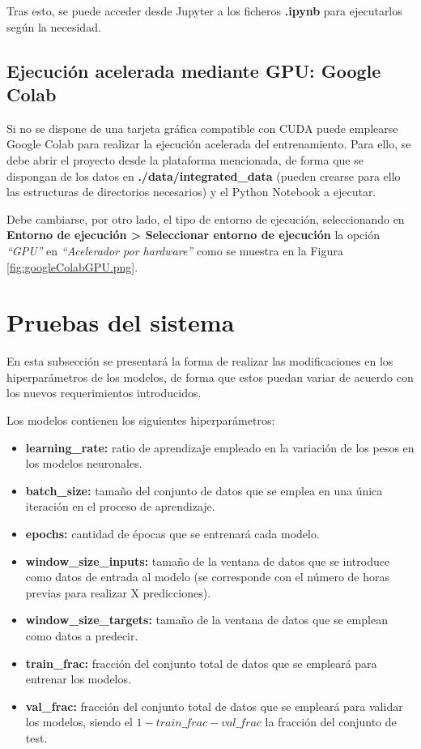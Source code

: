 
Tras esto, se puede acceder desde Jupyter a los ficheros \textbf{.ipynb} para ejecutarlos según la necesidad.

\subsection{Ejecución acelerada mediante GPU: Google Colab}
Si no se dispone de una tarjeta gráfica compatible con CUDA puede emplearse Google Colab para realizar la ejecución acelerada del entrenamiento.
Para ello, se debe abrir el proyecto desde la plataforma mencionada, de forma que se dispongan de los datos en \textbf{./data/integrated\_data} 
(pueden crearse para ello las estructuras de directorios necesarios) y el Python Notebook a ejecutar.

Debe cambiarse, por otro lado, el tipo de entorno de ejecución, seleccionando en \textbf{Entorno de ejecución > Seleccionar entorno de ejecución}
la opción \textit{``GPU''} en \textit{``Acelerador por hardware''} como se muestra en la Figura \ref{fig:googleColabGPU.png}.


\section{Pruebas del sistema}
En esta subsección se presentará la forma de realizar las modificaciones en los hiperparámetros de los modelos, de forma que estos puedan variar de acuerdo con los nuevos requerimientos introducidos.

Los modelos contienen los siguientes hiperparámetros:
\begin{itemize}
    \item \textbf{learning\_rate:} ratio de aprendizaje empleado en la variación de los pesos en los modelos neuronales.
    \item \textbf{batch\_size:} tamaño del conjunto de datos que se emplea en una única iteración en el proceso
        de aprendizaje.
    \item \textbf{epochs:} cantidad de épocas que se entrenará cada modelo.
    \item \textbf{window\_size\_inputs:} tamaño de la ventana de datos que se introduce como datos de entrada al modelo
        (se corresponde con el número de horas previas para realizar X predicciones).
    \item \textbf{window\_size\_targets:} tamaño de la ventana de datos que se emplean como datos a predecir.
    \item \textbf{train\_frac:} fracción del conjunto total de datos que se empleará para entrenar los modelos.
    \item \textbf{val\_frac:} fracción del conjunto total de datos que se empleará para validar los modelos, siendo el 
        \(1 - train\_frac - val\_frac\) la fracción del conjunto de test.
\end{itemize}

